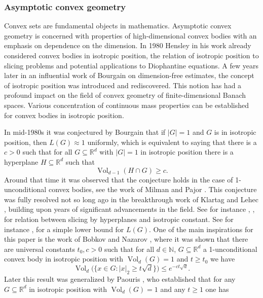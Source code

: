 \documentclass[10pt,a4paper]{amsart}
\numberwithin{equation}{section}
\newcommand{\R}{\mathbb{R}}
\newcommand{\N}{\mathbb{N}}
\DeclareMathOperator{\Vol}{Vol}
\begin{document}
\subsubsection{Asymptotic convex geometry}
Convex sets are fundamental objects in mathematics. Asymptotic convex geometry is concerned with properties of high-dimensional convex bodies with an emphasis on dependence on the dimension. In 1980 Hensley in his work \cite{He} already considered convex bodies in isotropic position, the relation of isotropic position to slicing problems and potential applications to Diophantine equations. A few years later in an influential work \cite{B1} of Bourgain on dimension-free estimates, the concept of isotropic position was introduced and rediscovered.
This notion has had a profound impact on the field of convex geometry of finite-dimensional Banach spaces. Various concentration of continuous mass properties can be established for convex bodies in isotropic position. 
\par In mid-1980s it was conjectured by Bourgain that if $|G|=1$ and $G$ is in isotropic position, then $L(G) \approx 1$ uniformly, which is equivalent to saying that there is a $c>0$ such that for all $G \subseteq \R^d$ with $|G|=1$ in isotropic position there is a hyperplane $H \subseteq \R^d$ such that 
\[
\Vol_{d-1}(H \cap G) \ge c.
\]
Around that time it was observed that the conjecture holds in the case of 1-unconditional convex bodies, see the work of Milman and Pajor \cite[b. Proposition, p. 85]{MP}.
This conjecture was fully resolved not so long ago in the breakthrough work of Klartag and Lehec \cite{iso conj}, building upon years of significant advancements in the field. See for instance \cite{He}, \cite[Section 3]{MP}, \cite[Theorem 3.1.2]{conv book} for relation between slicing by hyperplanes and isotropic constant. See for instance \cite[Lemma 4.1]{MP}, \cite[Proposition 3.3.1]{conv book} for a simple lower bound for $L(G)$.  
One of the main inspirations for this paper is the work of Bobkov and Nazarov \cite{bob-naz}, where it was shown that there are universal constants $t_0,c>0$ such that for all $d \in \N$, $G \subseteq\R^d$ a 1-unconditional convex body in isotropic position with $\Vol_d(G)=1$ and $t \ge t_0$ we have
\begin{equation} \label{eq:conc of mes bob-naz}
    \Vol_d\Big( \Big\{ x \in G: |x|_2 \ge t \sqrt{d} \Big\} \Big) \le e^{-ct\sqrt{d}}.
\end{equation}
Later this result was generalized by Paouris \cite{Pa}, who established that for any $G \subseteq \R^d$ in isotropic position with $\Vol_d(G)=1$ and any $t \ge 1$ one has
\end{document}
